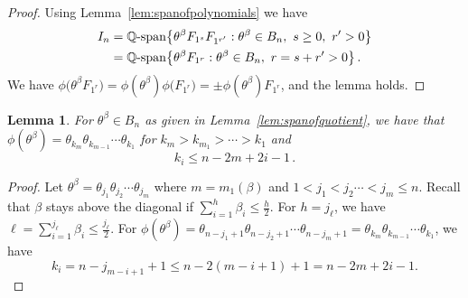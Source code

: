 \documentclass[11pt]{amsart}
\newtheorem{lemma}[theorem]{Lemma}
\theoremstyle{definition}
\numberwithin{equation}{section}
\begin{document}
\begin{proof} Using Lemma~\ref{lem:spanofpolynomials} we have
\begin{align*}
 I_n &=  {\mathbb Q}\text{\rm -span}\big\{  \theta^\beta F_{1^s} F_{1^{r'}} :  \theta^\beta \in B_n,\  s\ge 0,\  r'>0\big\}\\
       &=  {\mathbb Q}\text{\rm -span}\big\{  \theta^\beta F_{1^{r}} :  \theta^\beta \in B_n,\  r=s+r'>0\big\}\,.
 \end{align*}
We have $\phi\big(\theta^\beta F_{1^r}\big)=\phi(\theta^\beta) \phi\big(F_{1^r}\big) = \pm \phi(\theta^\beta) F_{1^r}$, and the lemma holds.
\end{proof}

\begin{lemma}\label{lem:phiB}
For $\theta^\beta\in B_n$ as given in Lemma~\ref{lem:spanofquotient}, we have that $\phi(\theta^\beta)=\theta_{k_m} \theta_{k_{m-1}}\cdots \theta_{k_1}$
for $k_m>k_{m_1}>\cdots >k_1$ and
\begin{equation}\label{eq:phiB}
k_i  \le  n-2m+2i-1\,.
\end{equation}
\end{lemma}

\begin{proof} Let $\theta^\beta=\theta_{j_1} \theta_{j_2}\cdots \theta_{j_m}$ where $m=m_1(\beta)$ and 
$1<j_1< j_2\cdots <j_m\le n$. Recall that $\beta$ stays above the diagonal
if $\sum_{i=1}^h \beta_i\le \frac{h}{2}$.  For $h=j_\ell$, we have
 $\ell=\sum_{i=1}^{j_\ell} \beta_i \le \frac{j_\ell}{2}$.
For $\phi(\theta^\beta)=\theta_{n-j_1+1} \theta_{n-j_2+1}\cdots \theta_{n-j_m+1}=\theta_{k_m} \theta_{k_{m-1}}\cdots \theta_{k_1}$, we have
 $$  k_i = n-j_{m-i+1}+1 \le n-2(m-i+1)+1 = n-2m+2i-1.
 $$
\vskip-18pt \end{proof}


\end{document}
